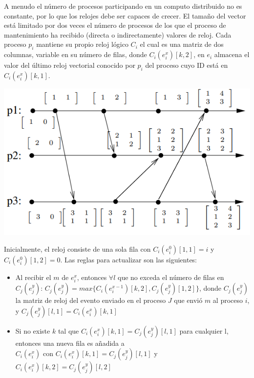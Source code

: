 \begin{itemize}
A menudo el número de procesos participando en un computo distribuido no es constante, 
por lo que los relojes debe ser capaces de crecer. El tamaño del vector está limitado 
por dos veces el número de procesos de los que el proceso de mantenimiento ha recibido 
(directa o indirectamente) valores de reloj. Cada proceso $p_i$ mantiene su propio reloj 
lógico $C_i$ el cual es una matriz de dos columnas, variable en su número de filas, 
donde $C_i(e_i^x)[k,2]$, en $e_i$ almacena el valor del último reloj vectorial conocido 
por $p_i$ del proceso cuyo ID está en $C_i(e_i^x)[k,1]$.\\


\begin{center}
    \includegraphics[scale=0.6]{Imagenes/rvd01.png}
    \end{center}

Inicialmente, el reloj consiste de una sola fila con $C_i(e_i^0)[1,1]=i$ y $C_i(e_i^0)[1,2]=0$.
Las reglas para actualizar son las siguientes:
\begin{itemize}
\item Al recibir el $m$ de $e_i^x$, entonces $\forall l$ que no exceda el número de filas 
en \\
$C_j(e_j^y)$: $C_j(e_j^y) = max\{C_i(e_i^{x-1})[k,2], C_j(e_j^y)[1,2]\}$, donde $C_j(e_j^y)$ 
la matriz de reloj del evento enviado en el proceso $J$ que envió $m$ al proceso $i$, 
y $C_j(e_j^y)[l,1]=C_i(e_i^x)[k,1]$

\item Si no existe $k$ tal que $C_i(e_i^x)[k,1] = C_j(e_j^y)[l,1]$ para cualquier l, 
entonces una nueva fila es añadida a \\
$C_i(e_i^x)$ con $C_i(e_i^x)[k,1] = C_j(e_j^y)[l,1]$ y $C_i(e_i^x)[k,2] = C_j(e_j^y)[l,2]$


\end{itemize}
\end{itemize}
